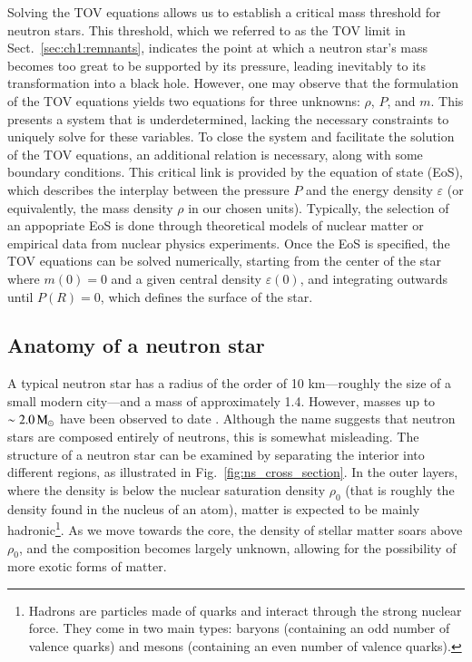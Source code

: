 \documentclass[main.tex]{subfiles}
\begin{document}
     Solving the TOV equations allows us to establish a critical mass threshold for neutron stars. This threshold, which we referred to as the TOV limit in Sect.~\ref{sec:ch1:remnants}, indicates the point at which a neutron star’s mass becomes too great to be supported by its pressure, leading inevitably to its transformation into a black hole. However, one may observe that the formulation of the TOV equations yields two equations for three unknowns: $\rho$, $P$, and $m$. This presents a system that is underdetermined, lacking the necessary constraints to uniquely solve for these variables. To close the system and facilitate the solution of the TOV equations, an additional relation is necessary, along with some boundary conditions. This critical link is provided by the equation of state (EoS), which describes the interplay between the pressure $P$ and the energy density $\varepsilon$ (or equivalently, the mass density $\rho$ in our chosen units). Typically, the selection of an appopriate EoS is done through theoretical models of nuclear matter or empirical data from nuclear physics experiments. Once the EoS is specified, the TOV equations can be solved numerically, starting from the center of the star where $m(0) = 0$ and a given central density $\varepsilon(0)$, and integrating outwards until $P(R) = 0$, which defines the surface of the star.
     
    \subsection{Anatomy of a neutron star}\label{sec:ns_anatomy}
    A typical neutron star has a radius of the order of 10 km---roughly the size of a small modern city---and a mass of approximately 1.4\msun. However, masses up to $\sim 2.0\mathrm{\,M_\odot}$ have been observed to date \citep[e.g.,][]{feryal2016}. Although the name suggests that neutron stars are composed entirely of neutrons, this is somewhat misleading.
    The structure of a neutron star can be examined by separating the interior into different regions, as illustrated in Fig.~\ref{fig:ns_cross_section}. In the outer layers, where the density is below the nuclear saturation density $\rho_0$ (that is roughly the density found in the nucleus of an atom), matter is expected to be mainly hadronic\footnote{Hadrons are particles made of quarks and interact through the strong nuclear force. They come in two main types: baryons (containing an odd number of valence quarks) and mesons (containing an even number of valence quarks).}. As we move towards the core, the density of stellar matter soars above $\rho_0$, and the composition becomes largely unknown, allowing for the possibility of more exotic forms of matter.
\end{document}
